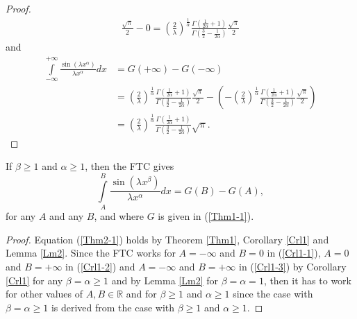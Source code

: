\documentclass[smallextended]{svjour3}
\begin{document}
\begin{proof}
\begin{multline}
\frac{\sqrt{\pi}}{2}-0=\left(\frac{2}{\lambda}\right)^{\frac{1}{\alpha}}\frac{\Gamma\left(\frac{1}{2\alpha}+1\right)}{\Gamma\left(\frac{3}{2}-\frac{1}{2\alpha}\right)}\frac{\sqrt{\pi}}{2}
\end{multline}
and
\begin{align}
\int\limits_{-\infty}^{+\infty} \frac{\sin{(\lambda x^\alpha)
}}{\lambda x^\alpha}dx&=G(+\infty)-G(-\infty)
\nonumber\\&=\left(\frac{2}{\lambda}\right)^{\frac{1}{\alpha}}\frac{\Gamma\left(\frac{1}{2\alpha}+1\right)}{\Gamma\left(\frac{3}{2}-\frac{1}{2\alpha}\right)}
\frac{\sqrt{\pi}}{2}-\left(-\left(\frac{2}{\lambda}\right)^{\frac{1}{\alpha}}\frac{\Gamma\left(\frac{1}{2\alpha}+1\right)}{\Gamma\left(\frac{3}{2}-\frac{1}{2\alpha}\right)}\frac{\sqrt{\pi}}{2}\right)
\nonumber\\&=\left(\frac{2}{\lambda}\right)^{\frac{1}{\alpha}}\frac{\Gamma\left(\frac{1}{2\alpha}+1\right)}{\Gamma\left(\frac{3}{2}-\frac{1}{2\alpha}\right)}\sqrt{\pi}.
\end{align}
\end{proof}

\begin{theorem}
If $\beta \ge1$ and $\alpha \ge 1$, then the FTC gives
\begin{equation}
\int\limits_{A}^{B} \frac{\sin{(\lambda x^\beta)
}}{\lambda x^\alpha}dx=G(B)-G(A),
\label{Thm2-1}
\end{equation}
for any $A$ and any $B$, and where $G$ is given in (\ref{Thm1-1}).
\label{Thm2}
\end{theorem}

\begin{proof}
Equation (\ref{Thm2-1}) holds by Theorem \ref{Thm1}, Corollary \ref{Crl1} and Lemma \ref{Lm2}. Since the FTC works for $A=-\infty$ and $B=0$ in (\ref{Crl1-1}), $A=0$ and $B=+\infty$ in (\ref{Crl1-2}) and  $A=-\infty$ and $B=+\infty$ in (\ref{Crl1-3}) by Corollary \ref{Crl1} for any $\beta=\alpha \ge1$ and by Lemma \ref{Lm2} for $\beta=\alpha=1$, then it has to work for other values of $A,B\in \mathbb{R}$ and for $\beta\ge1$ and $\alpha\ge1$ since the case with $\beta=\alpha\ge1$ is derived from the case with $\beta\ge1$ and $\alpha\ge1$.
\end{proof}
\end{document}
